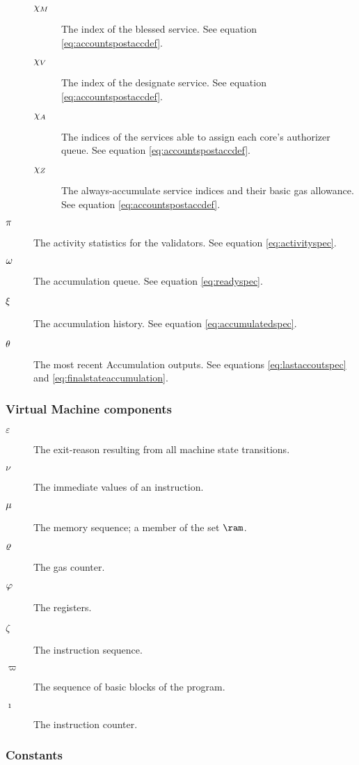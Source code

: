 \begin{description}
\begin{description}
    \item[$\chi_M$] The index of the blessed service. See equation \ref{eq:accountspostaccdef}.
    \item[$\chi_V$] The index of the designate service. See equation \ref{eq:accountspostaccdef}.
    \item[$\chi_A$] The indices of the services able to assign each core's authorizer queue. See equation \ref{eq:accountspostaccdef}.
    \item[$\chi_Z$] The always-accumulate service indices and their basic gas allowance. See equation \ref{eq:accountspostaccdef}.
  \end{description}
  \item[$\pi$] The activity statistics for the validators. See equation \ref{eq:activityspec}.
  \item[$\omega$] The accumulation queue. See equation \ref{eq:readyspec}.
  \item[$\xi$] The accumulation history. See equation \ref{eq:accumulatedspec}.
  \item[$\theta$] The most recent Accumulation outputs. See equations \ref{eq:lastaccoutspec} and \ref{eq:finalstateaccumulation}.
\end{description}

\subsubsection{Virtual Machine components}

\begin{description}
  \item[$\varepsilon$] The exit-reason resulting from all machine state transitions.
  \item[$\nu$] The immediate values of an instruction.
  \item[$\mu$] The memory sequence; a member of the set $\ram$.
  \item[$\varrho$] The gas counter.
  \item[$\varphi$] The registers.
  \item[$\zeta$] The instruction sequence.
  \item[$\varpi$] The sequence of basic blocks of the program.
  \item[$\imath$] The instruction counter.
\end{description}

\subsubsection{Constants}

